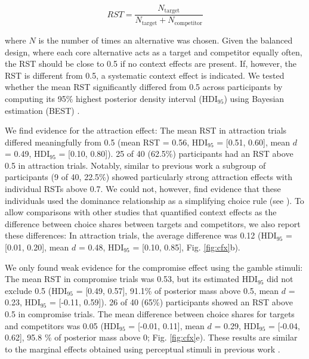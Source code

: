 \documentclass[11pt, a4paper]{article}
\begin{document}
\begin{equation}
    RST = \frac{N_{\text{target}}}{N_{\text{target}} + N_{\text{competitor}}}
\end{equation}

where $N$ is the number of times an alternative was chosen. Given the balanced design, where each core alternative acts as a target and competitor equally often, the RST should be close to 0.5 if no context effects are present. If, however, the RST is different from 0.5, a systematic context effect is indicated. We tested whether the mean RST significantly differed from 0.5 across participants by computing its 95\% highest posterior density interval (HDI$_{95}$) using Bayesian estimation (BEST) \autocite{kruschke2013BayesianEstimationSupersedes,kruschke2014DoingBayesianData}. 

We find evidence for the attraction effect: The mean RST in attraction trials differed meaningfully from 0.5 (mean RST = 0.56, HDI$_{95}$ = [0.51, 0.60], mean $d$ = 0.49, HDI$_{95}$ = [0.10, 0.80]). 25 of 40 (62.5\%) participants had an RST above 0.5 in attraction trials. Notably, similar to previous work \autocite{trueblood2012MultialternativeContextEffects} a subgroup of participants (9 of 40, 22.5\%) showed particularly strong attraction effects with individual RSTs above 0.7. We could not, however, find evidence that these individuals used the dominance relationship as a simplifying choice rule (see ). To allow comparisons with other studies that quantified context effects as the difference between choice shares between targets and competitors, we also report these differences: In attraction trials, the average difference was 0.12 (HDI$_{95}$ = [0.01, 0.20], mean $d$ = 0.48, HDI$_{95}$ = [0.10, 0.85], Fig. \ref{fig:cfx}b). 

We only found weak evidence for the compromise effect using the gamble stimuli: The mean RST in compromise trials was 0.53, but its estimated HDI$_{95}$ did not exclude 0.5 (HDI$_{95}$ = [0.49, 0.57], 91.1\% of posterior mass above 0.5, mean $d$ = 0.23, HDI$_{95}$ = [-0.11, 0.59]). 26 of 40 (65\%) participants showed an RST above 0.5 in compromise trials. The mean difference between choice shares for targets and competitors was 0.05 (HDI$_{95}$ = [-0.01, 0.11], mean $d$ = 0.29, HDI$_{95}$ = [-0.04, 0.62], 95.8 \% of posterior mass above 0; Fig. \ref{fig:cfx}e). These results are similar to the marginal effects obtained using perceptual stimuli in previous work \autocite{trueblood2015FragileNatureContextual,trueblood2013NotJustConsumers}. 
\end{document}
